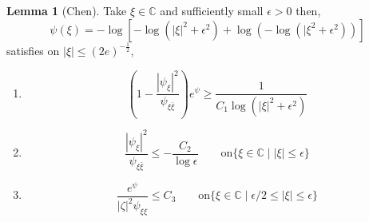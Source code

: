 \documentclass[12pt]{extarticle}
\newcommand{\C}{\mathbb{C}}
\theoremstyle{definition}
\newtheorem{lemma}[theorem]{Lemma}
\begin{document}
\begin{lemma}[Chen]
Take $\xi \in \C$ and sufficiently small $\epsilon > 0$ then,
\[ \psi(\xi) = - \log{\left[ - \log{( |\xi|^2 + \epsilon^2)} + \log{\left( - \log{(|\xi^2 + \epsilon^2)} \right)} \right]} \]
satisfies on $|\xi| \le (2 e)^{-\frac{1}{2}}$,
\begin{enumerate}
\item 
\[ \left( 1 - \frac{|\psi_\xi|^2}{\psi_{\xi \bar{\xi}}} \right) e^{\psi} \ge \frac{1}{C_1 \log{( |\xi|^2 + \epsilon^2)}} \]
\item
\[ \frac{|\psi_\xi|^2}{\psi_{\xi \bar{\xi}}} \le - \frac{C_2}{\log{\epsilon}} \quad \quad \text{on} \{ \xi \in \C \mid |\xi| \le \epsilon \} \]
\item
\[ \frac{e^\psi}{|\zeta|^2 \psi_{\xi \xi}} \le C_3 \quad \quad \text{on} \{ \xi \in \C \mid \epsilon / 2 \le |\xi| \le \epsilon \} \]
\end{enumerate}
\end{lemma}
\end{document}
